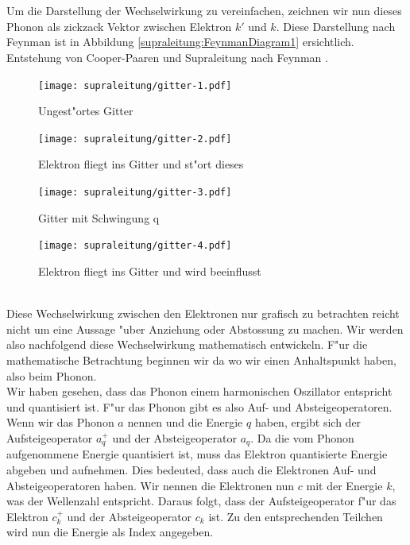 \begin{refsection}
\\
\\
Um die Darstellung der Wechselwirkung zu vereinfachen, zeichnen wir nun dieses Phonon als zickzack Vektor zwischen Elektron $k'$ und $k$. Diese Darstellung nach Feynman ist in Abbildung \ref{supraleitung:FeynmanDiagram1} ersichtlich.
\\

Entstehung von Cooper-Paaren und Supraleitung nach Feynman
\cite{supraleitung:feynman}.
\begin{figure}
\centering
\texttt{[image: supraleitung/gitter-1.pdf]} %
\caption{Ungest"ortes Gitter
\label{supraleitung:Gitter1}}
\end{figure}
\begin{figure}
\centering
\texttt{[image: supraleitung/gitter-2.pdf]} %
\caption{Elektron fliegt ins Gitter und st"ort dieses
\label{supraleitung:Gitter2}}
\end{figure}
\begin{figure}
\centering
\texttt{[image: supraleitung/gitter-3.pdf]} %
\caption{Gitter mit Schwingung q
\label{supraleitung:Gitter3}}
\end{figure}
\begin{figure}
\centering
\texttt{[image: supraleitung/gitter-4.pdf]} %
\caption{Elektron fliegt ins Gitter und wird beeinflusst
\label{supraleitung:Gitter4}}
\end{figure}
\\
Diese Wechselwirkung zwischen den Elektronen nur grafisch zu betrachten reicht nicht um eine Aussage "uber Anziehung oder Abstossung zu machen. Wir werden also nachfolgend diese Wechselwirkung mathematisch entwickeln. F"ur die mathematische Betrachtung beginnen wir da wo wir einen Anhaltspunkt haben, also beim Phonon.
\\
Wir haben gesehen, dass das Phonon einem harmonischen Oszillator entspricht und quantisiert ist. F"ur das Phonon gibt es also Auf- und Absteigeoperatoren. Wenn wir das Phonon $a$ nennen und die Energie $q$ haben, ergibt sich der Aufsteigeoperator $a^+_q$ und der Absteigeoperator $a_q$. Da die vom Phonon aufgenommene Energie quantisiert ist, muss das Elektron quantisierte Energie abgeben und aufnehmen. Dies bedeuted, dass auch die Elektronen Auf- und Absteigeoperatoren haben. Wir nennen die Elektronen nun $c$ mit der Energie $k$, was der Wellenzahl entspricht. Daraus folgt, dass der Aufsteigeoperator f"ur das Elektron $c^+_k$ und der Absteigeoperator $c_k$ ist. Zu den entsprechenden Teilchen wird nun die Energie als Index angegeben.

\end{refsection}
